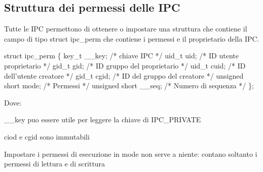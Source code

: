 \subsection*{Struttura dei permessi delle I\+PC}

Tutte le I\+PC permettono di ottenere o impostare una struttura che contiene il campo di tipo {\ttfamily struct ipc\+\_\+perm} che contiene i permessi e il proprietario della I\+PC.


\begin{DoxyCode}
\textcolor{keyword}{struct }ipc\_perm \{
    key\_t \_\_key; \textcolor{comment}{/* chiave IPC */}
    uid\_t uid; \textcolor{comment}{/* ID utente proprietario */}
    gid\_t gid; \textcolor{comment}{/* ID gruppo del proprietario */}
    uid\_t cuid; \textcolor{comment}{/* ID dell'utente creatore */}
    gid\_t cgid; \textcolor{comment}{/* ID del gruppo del creatore */}
    \textcolor{keywordtype}{unsigned} \textcolor{keywordtype}{short} mode; \textcolor{comment}{/* Permessi */}
    \textcolor{keywordtype}{unsigned} \textcolor{keywordtype}{short} \_\_seq; \textcolor{comment}{/* Numero di sequenza */}
\};
\end{DoxyCode}


Dove\+:
\begin{DoxyItemize}
\item {\ttfamily \+\_\+\+\_\+key} puo\textquotesingle{} essere utile per leggere la chiave di I\+P\+C\+\_\+\+P\+R\+I\+V\+A\+TE
\item {\ttfamily ciod} e {\ttfamily cgid} sono immutabili
\item Impostare i permessi di esecuzione in {\ttfamily mode} non serve a niente\+: contano soltanto i permessi di lettura e di scrittura 
\end{DoxyItemize}